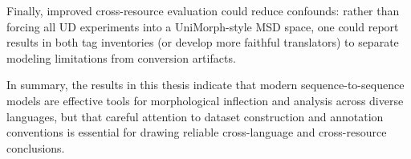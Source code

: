 Finally, improved cross-resource evaluation could reduce confounds: rather than forcing all \ac{UD} experiments into a UniMorph-style \ac{MSD} space, one could report results in both tag inventories (or develop more faithful translators) to separate modeling limitations from conversion artifacts. 

In summary, the results in this thesis indicate that modern sequence-to-sequence models are effective tools for morphological inflection and analysis across diverse languages, but that careful attention to dataset construction and annotation conventions is essential for drawing reliable cross-language and cross-resource conclusions.